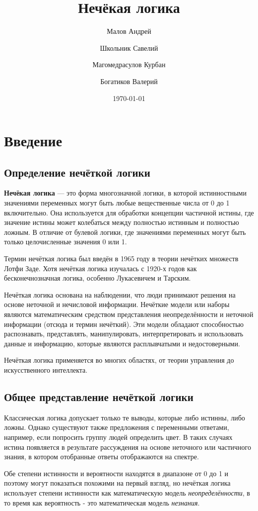 \documentclass[a4paper,12pt]{report}
\author{
	Малов Андрей\\
	\and
	Школьник Савелий\\
	\and
	Магомедрасулов Курбан\\
	\and
	Богатиков Валерий\\
}
\title{Нечёкая логика}
\date{\today}
\begin{document}
	
\maketitle

\tableofcontents

\chapter{Введение}
\section{Определение нечёткой логики}
\textbf{Нечёкая логика} --- это форма многозначной логики, в которой истинностными значениями переменных могут быть любые вещественные числа от 0 до 1 включительно. Она используется для обработки концепции частичной истины, где значение истины может колебаться между полностью истинным и полностью ложным. В отличие от булевой логики, где значениями переменных могут быть только целочисленные значения 0 или 1.

Термин нечёткая логика был введён в 1965 году в теории нечётких множеств Лотфи Заде. Хотя нечёткая логика изучалась с 1920-х годов как бесконечнозначная логика, особенно Лукасевичем и Тарским.

Нечёткая логика основана на наблюдении, что люди принимают решения на основе неточной и нечисловой информации. Нечёткие модели или наборы являются математическим средством представления неопределённости и неточной информации (отсюда и термин нечёткий). Эти модели обладают способностью распознавать, представлять, манипулировать, интерпретировать и использовать данные и информацию, которые являются расплывчатыми и недостоверными.

Нечёткая логика применяется во многих областях, от теории управления до искусственного интеллекта.

\section{Общее представление нечёткой логики}
Классическая логика допускает только те выводы, которые либо истинны, либо ложны. Однако существуют также предложения с переменными ответами, например, если попросить группу людей определить цвет. В таких случаях истина появляется в результате рассуждения на основе неточного или частичного знания, в котором отобранные ответы отображаются на спектре.

Обе степени истинности и вероятности находятся в диапазоне от 0 до 1 и поэтому могут показаться похожими на первый взгляд, но нечёткая логика использует степени истинности как математическую модель \textit{неопределённости}, в то время как вероятность - это математическая модель \textit{незнания}.
\end{document}
